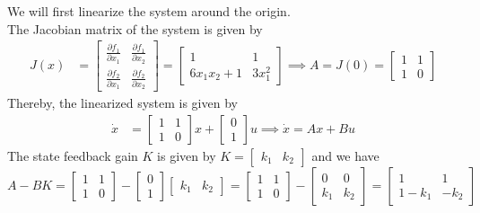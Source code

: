 We will first linearize the system around the origin.\\
The Jacobian matrix of the system is given by
\begin{align*}
    J(x)
     & =
    \begin{bmatrix}
        \frac{\partial f_{1}}{\partial x_{1}} & \frac{\partial f_{1}}{\partial x_{2}} \\
        \frac{\partial f_{2}}{\partial x_{1}} & \frac{\partial f_{2}}{\partial x_{2}}
    \end{bmatrix}
    =
    \begin{bmatrix}
        1               & 1           \\
        6 x_{1} x_{2}+1 & 3 x_{1}^{2}
    \end{bmatrix}
    \implies
    A
    =
    J(0)
    =
    \begin{bmatrix}
        1 & 1 \\
        1 & 0
    \end{bmatrix}
\end{align*}
Thereby, the linearized system is given by
\begin{align*}
    \dot{x}
     & =
    \begin{bmatrix}
        1 & 1 \\
        1 & 0
    \end{bmatrix}
    x
    +
    \begin{bmatrix}
        0 \\
        1
    \end{bmatrix}
    u
    \implies
    \dot x = Ax + Bu
\end{align*}
The state feedback gain \( K \) is given by
\(
K =
\begin{bmatrix}
    k_{1} & k_{2}
\end{bmatrix}
\)
and we have
\begin{equation*}
    A - BK
    =
    \begin{bmatrix}
        1 & 1 \\
        1 & 0
    \end{bmatrix}
    -
    \begin{bmatrix}
        0 \\ 1
    \end{bmatrix}
    \begin{bmatrix}
        k_{1} & k_{2}
    \end{bmatrix}
    =
    \begin{bmatrix}
        1 & 1 \\
        1 & 0
    \end{bmatrix}
    -
    \begin{bmatrix}
        0     & 0     \\
        k_{1} & k_{2}
    \end{bmatrix}
    =
    \begin{bmatrix}
        1       & 1    \\
        1 - k_1 & -k_2
    \end{bmatrix}
\end{equation*}
